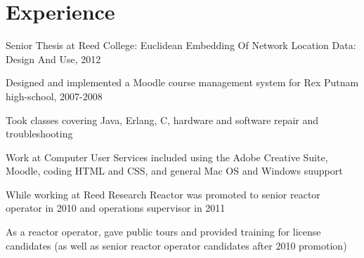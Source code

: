 \documentclass[letterpaper]{article}
\renewenvironment{itemize}{\begin{list}{}{\setlength{\leftmargin}{1.5em}}}{\end{list}}%
\begin{document}
\section*{Experience}%

\begin{itemize}
\item Senior Thesis at Reed College: Euclidean Embedding Of Network Location Data: Design And Use, 2012
\item Designed and implemented a Moodle course management system for Rex Putnam high-school, 2007-2008
\item Took classes covering Java, Erlang, C, %
hardware and software repair and troubleshooting
\item Work at Computer User Services included using the Adobe Creative Suite, Moodle, coding HTML and CSS, and general Mac OS and Windows suupport
\item While working at Reed Research Reactor was promoted to senior reactor operator in 2010 and operations supervisor in 2011
\item As a reactor operator, gave public tours and provided training for license candidates (as well as senior reactor operator candidates after 2010 promotion)
\end{itemize}
\end{document}
